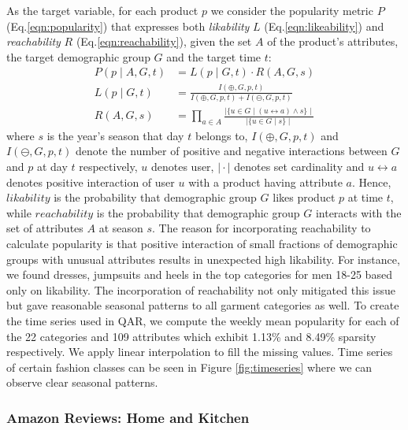 \documentclass{article}
\begin{document}
As the target variable, for each product $p$ we consider the popularity metric $P$ (Eq.\ref{eqn:popularity}) that expresses both \textit{likability} $L$ (Eq.\ref{eqn:likeability}) and \textit{reachability} $R$ (Eq.\ref{eqn:reachability}), given the set $A$ of the product's attributes, the target demographic group $G$ and the target time $t$:
\begin{subequations}
\begin{align}
\label{eqn:popularity}
P(p\mid A, G, t) & = L(p\mid G, t) \cdot R(A, G, s) \\ 
\label{eqn:likeability}
L(p\mid G, t) & = \frac{I(\oplus, G, p, t)}{I(\oplus, G, p, t) + I(\ominus, G, p, t)}\\
\label{eqn:reachability}
R(A, G, s) & = \prod_{a\in A}\frac{\mid \{u\in G\mid (u\leftrightarrow a)\land s\}\mid}{\mid \{u\in G\mid s\}\mid}
\end{align}
\end{subequations}
where $s$ is the year's season that day $t$ belongs to, $I(\oplus,G, p, t)$ and $I(\ominus,G, p, t)$ denote the number of positive and negative interactions between $G$ and $p$ at day $t$ respectively, $u$ denotes user, $\mid\cdot\mid$ denotes set cardinality and $u\leftrightarrow a$ denotes positive interaction of user $u$ with a product having attribute $a$. Hence, $likability$ is the probability that demographic group $G$ likes product $p$ at time $t$, while $reachability$ is the probability that demographic group $G$ interacts with the set of attributes $A$ at season $s$. The reason for incorporating reachability to calculate popularity is that positive interaction of small fractions of demographic groups with unusual attributes results in unexpected high likability. For instance, we found dresses, jumpsuits and heels in the top categories for men 18-25 based only on likability. The incorporation of reachability not only mitigated this issue but gave reasonable seasonal patterns to all garment categories as well. To create the time series used in QAR, we compute the weekly mean popularity for each of the 22 categories and 109 attributes which exhibit 1.13\% and 8.49\% sparsity respectively. We apply linear interpolation to fill the missing values. Time series of certain fashion classes can be seen in Figure \ref{fig:timeseries} where we can observe clear seasonal patterns. 

\subsubsection{\textbf{Amazon Reviews: Home and Kitchen}}
\end{document}
